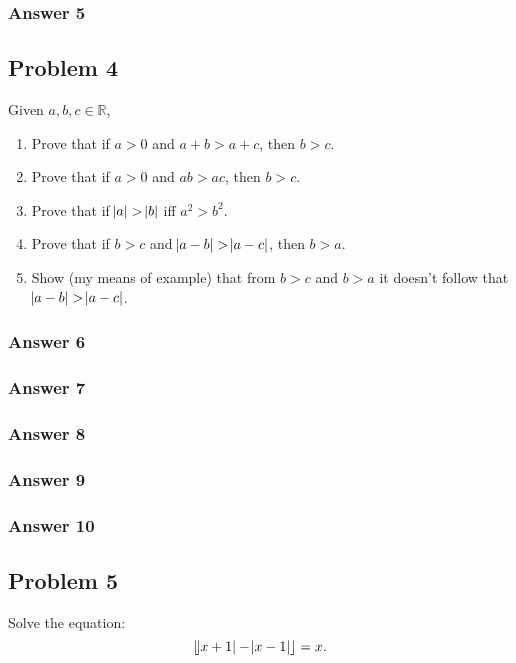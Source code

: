 \documentclass[11pt]{article}
\begin{document}
\subsubsection{Answer 5}
\label{sec-1-3-1}

\subsection{Problem 4}
\label{sec-1-4}
Given $a, b, c \in \mathbb{R}$,
\begin{enumerate}
\item Prove that if $a > 0$ and $a + b > a + c$, then $b > c$.
\item Prove that if $a > 0$ and $ab > ac$, then $b > c$.
\item Prove that if $\abs{a} > \abs{b}$ iff $a^2 > b^2$.
\item Prove that if $b > c$ and $\abs{a-b} > \abs{a-c}$, then $b > a$.
\item Show (my means of example) that from $b > c$ and $b > a$ it doesn't
follow that $\abs{a-b} > \abs{a-c}$.
\end{enumerate}

\subsubsection{Answer 6}
\label{sec-1-4-1}
\subsubsection{Answer 7}
\label{sec-1-4-2}
\subsubsection{Answer 8}
\label{sec-1-4-3}
\subsubsection{Answer 9}
\label{sec-1-4-4}
\subsubsection{Answer 10}
\label{sec-1-4-5}
\subsection{Problem 5}
\label{sec-1-5}
Solve the equation:
\begin{equation*}
   \lfloor \abs{x+1}-\abs{x-1} \rfloor = x.
\end{equation*}
\end{document}
